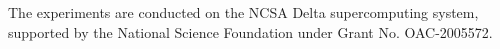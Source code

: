 The experiments are conducted on the NCSA Delta supercomputing system, supported by the National Science Foundation under Grant No. OAC-2005572.  